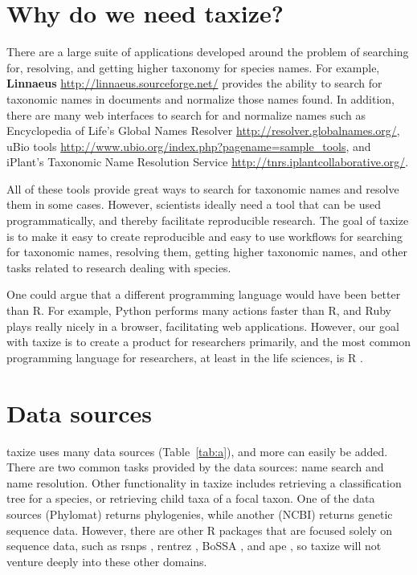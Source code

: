 \documentclass[letterpaper,superscriptaddress,showkeys,longbibliography,10pt]{revtex4-1}\usepackage{graphicx, color}
\begin{document}
\section{Why do we need taxize?}

There are a large suite of applications developed around the problem of searching for, resolving, and getting higher taxonomy for species names. For example, \textbf{Linnaeus} \url{http://linnaeus.sourceforge.net/} provides the ability to search for taxonomic names in documents and normalize those names found. In addition, there are many web interfaces to search for and normalize names such as Encyclopedia of Life's Global Names Resolver \url{http://resolver.globalnames.org/}, uBio tools \url{http://www.ubio.org/index.php?pagename=sample_tools}, and iPlant's Taxonomic Name Resolution Service \url{http://tnrs.iplantcollaborative.org/}. 

All of these tools provide great ways to search for taxonomic names and resolve them in some cases. However, scientists ideally need a tool that can be used programmatically, and thereby facilitate reproducible research. The goal of taxize is to make it easy to create reproducible and easy to use workflows for searching for taxonomic names, resolving them, getting higher taxonomic names, and other tasks related to research dealing with species. 

One could argue that a different programming language would have been better than R. For example, Python performs many actions faster than R, and Ruby plays really nicely in a browser, facilitating web applications. However, our goal with taxize is to create a product for researchers primarily, and the most common programming language for researchers, at least in the life sciences, is R \cite{REF}. 

\section{Data sources}

taxize uses many data sources (Table~\ref{tab:a}), and more can easily be added. There are two common tasks provided by the data sources: name search and name resolution. Other functionality in taxize includes retrieving a classification tree for a species, or retrieving child taxa of a focal taxon. One of the data sources (Phylomat) returns phylogenies, while another (NCBI) returns genetic sequence data. However, there are other R packages that are focused solely on sequence data, such as rsnps \cite{chamberlain2013}, rentrez \cite{winter2013}, BoSSA \cite{lefeuvre2010}, and ape \cite{paradis2004}, so taxize will not venture deeply into these other domains. 
\end{document}
